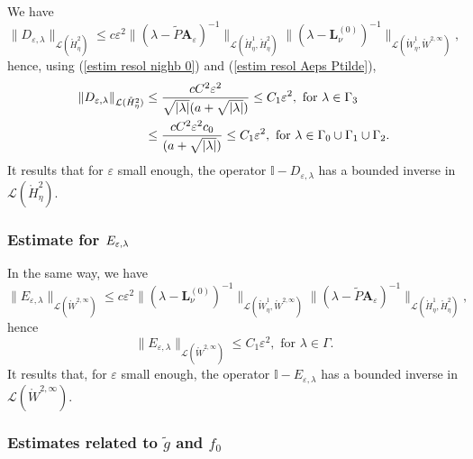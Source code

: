 \documentclass[11pt]{article}
\begin{document}
We have%
\begin{equation*}
\|D_{\varepsilon ,\lambda }\|_{\mathcal{L}(\mathring{H}_{\eta}^{2})}\leq
c\varepsilon ^{2}\|(\lambda -\widetilde{P}\boldsymbol{A}_{\varepsilon
})^{-1}\|_{\mathcal{L}(\mathring{H}_{\eta}^{1},\mathring{H}_{\eta}^{2})}\|(\lambda
-\boldsymbol{L}_{\nu }^{(0)})^{-1}\|_{\mathcal{L}(\mathring{W}_{\eta}^{1},%
\mathring{W}^{2,\infty })},
\end{equation*}%
hence, using (\ref{estim resol nighb 0}) and
(\ref{estim resol Aeps Ptilde}),
\begin{align*}
\|D_{\varepsilon ,\lambda }\|_{\mathcal{L}(\mathring{H}_{\eta}^{2})} &\leq \frac{%
cC^{2}\varepsilon ^{2}}{\sqrt{|\lambda |}(a+\sqrt{%
|\lambda |})}\leq  C_1 \varepsilon^2 ,\text{ for }\lambda
\in \Gamma_3 
\\
&\leq
\frac{cC^{2}\varepsilon^{2} c_0}{(a+\sqrt{%
|\lambda |})}\leq  C_1 \varepsilon^2 ,\text{ for }\lambda
\in \Gamma_0 \cup \Gamma_1 \cup \Gamma_2. 
\end{align*}%
It results that for $\varepsilon $ small enough, the operator $\mathbb{I}%
-D_{\varepsilon ,\lambda }$ has a bounded inverse in $\mathcal{L}(\mathring{H%
}_{\eta}^{2})$.

\subsubsection{Estimate for $E_{\protect\varepsilon ,\protect\lambda }$}

In the same way, we have%
\begin{equation*}
\|E_{\varepsilon ,\lambda }\|_{\mathcal{L}(\mathring{W}^{2,\infty })}\leq
c\varepsilon ^{2}\|(\lambda -\boldsymbol{L}_{\nu }^{(0)})^{-1}\|_{\mathcal{L}%
(\mathring{W}_{\eta}^{1},\mathring{W}^{2,\infty })}\|(\lambda -\widetilde{P}%
\boldsymbol{A}_{\varepsilon })^{-1}\|_{\mathcal{L}(\mathring{H}_{\eta}^{1},%
\mathring{H}_{\eta}^{2})},
\end{equation*}%
hence%
\begin{equation*}
\|E_{\varepsilon ,\lambda }\|_{\mathcal{L}(\mathring{W}^{2,\infty })}\leq 
C_1 \varepsilon^2,\text{ for }\lambda \in \Gamma .
\end{equation*}%
It results that, for $\varepsilon $ small enough, the operator $\mathbb{I}%
-E_{\varepsilon ,\lambda }$ has a bounded inverse in $\mathcal{L}(\mathring{W%
}^{2,\infty }).$

\subsubsection{Estimates related to $\widetilde{g}$ and $f_{0}$}
\end{document}
